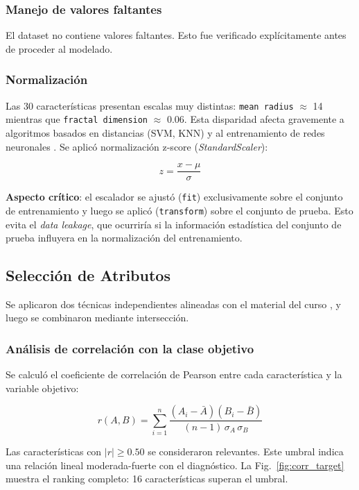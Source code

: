 \documentclass[journal]{IEEEtran}
\begin{document}
\subsubsection{Manejo de valores faltantes}
El dataset no contiene valores faltantes. Esto fue verificado explícitamente antes de proceder al modelado.

\subsubsection{Normalización}
Las 30 características presentan escalas muy distintas: \texttt{mean radius} $\approx$ 14 mientras que \texttt{fractal dimension} $\approx$ 0.06. Esta disparidad afecta gravemente a algoritmos basados en distancias (SVM, KNN) y al entrenamiento de redes neuronales \cite{kantardzic}. Se aplicó normalización z-score (\textit{StandardScaler}):

\begin{equation}
  z = \frac{x - \mu}{\sigma}
\end{equation}

\textbf{Aspecto crítico}: el escalador se ajustó (\texttt{fit}) exclusivamente sobre el conjunto de entrenamiento y luego se aplicó (\texttt{transform}) sobre el conjunto de prueba. Esto evita el \textit{data leakage}, que ocurriría si la información estadística del conjunto de prueba influyera en la normalización del entrenamiento.

\subsection{Selección de Atributos}

Se aplicaron dos técnicas independientes alineadas con el material del curso \cite{feature_sel}, y luego se combinaron mediante intersección.

\subsubsection{Análisis de correlación con la clase objetivo}
Se calculó el coeficiente de correlación de Pearson entre cada característica y la variable objetivo:

\begin{equation}
  r(A, B) = \sum_{i=1}^{n} \frac{(A_i - \bar{A})(B_i - \bar{B})}{(n-1) \, \sigma_A \, \sigma_B}
\end{equation}

Las características con $|r| \geq 0.50$ se consideraron relevantes. Este umbral indica una relación lineal moderada-fuerte con el diagnóstico. La Fig.~\ref{fig:corr_target} muestra el ranking completo: 16 características superan el umbral.
\end{document}
